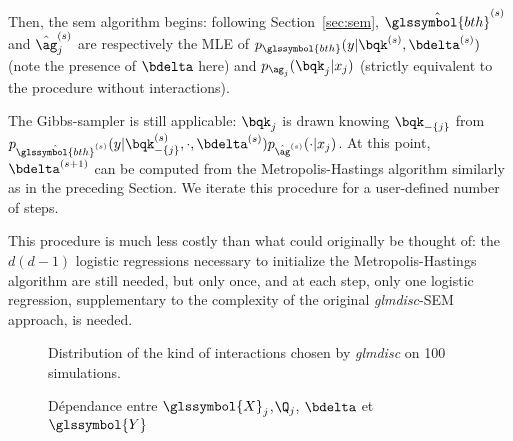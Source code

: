 Then, the \gls{sem} algorithm begins: following Section~\ref{sec:sem}, $\hat{\glssymbol{bth}}^{(s)}$ and $\hat{\ag}_j^{(s)}$ are respectively the MLE of $p_{\glssymbol{bth}}(y | \bqk^{(s)}, \bdelta^{(s)})$ (note the presence of $\bdelta$ here) and $p_{\ag_j}(\bqk_j | x_j)$ (strictly equivalent to the procedure without interactions).

The Gibbs-sampler is still applicable: $\bqk_j$ is drawn knowing $\bqk_{-\{j\}}$ from $p_{\hat{\glssymbol{bth}}^{(s)}}(y | \bqk_{-\{j\}}^{(s)}, \cdot, \bdelta^{(s)}) p_{\hat{\ag}^{(s)}}(\cdot | x_j)$. At this point, $\bdelta^{(s+1)}$ can be computed from the Metropolis-Hastings algorithm similarly as in the preceding Section. We iterate this procedure for a user-defined number of steps.

This procedure is much less costly than what could originally be thought of: the $d(d-1)$ logistic regressions necessary to initialize the Metropolis-Hastings algorithm are still needed, but only once, and at each step, only one logistic regression, supplementary to the complexity of the original \textit{glmdisc}-SEM approach, is needed.



\begin{figure}
\centering
\resizebox{\linewidth}{6cm}{%

}
\caption{\label{fig:simulated_interaction} Distribution of the kind of interactions chosen by \textit{glmdisc} on 100 simulations.}
\end{figure}




\begin{figure}
\centering
{}
\caption{\label{fig:dep2} Dépendance entre $\glssymbol{X}_j$,$\Q_j$, $\bdelta$ et $\glssymbol{Y}$} 
\end{figure}




